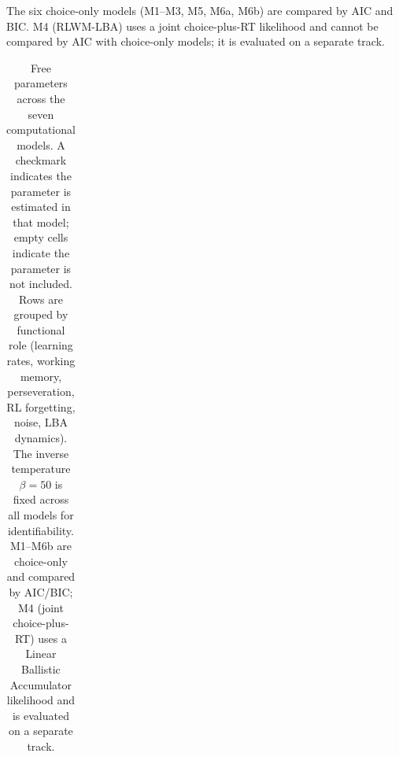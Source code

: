 \documentclass{article}
\begin{document}
The six choice-only models (M1--M3, M5, M6a, M6b) are compared by AIC
and BIC. M4 (RLWM-LBA) uses a joint choice-plus-RT likelihood and cannot
be compared by AIC with choice-only models; it is evaluated on a
separate track.

{

\begin{longtable}[]{@{}
  >{\raggedright\arraybackslash}p{}
  >{\raggedright\arraybackslash}p{}
  >{\raggedright\arraybackslash}p{}
  >{\raggedright\arraybackslash}p{}
  >{\raggedright\arraybackslash}p{}
  >{\raggedright\arraybackslash}p{}
  >{\raggedright\arraybackslash}p{}
  >{\raggedright\arraybackslash}p{}
  >{\raggedright\arraybackslash}p{}@{}}

\caption{\label{tbl-model-architecture}Free parameters across the seven
computational models. A checkmark indicates the parameter is estimated
in that model; empty cells indicate the parameter is not included. Rows
are grouped by functional role (learning rates, working memory,
perseveration, RL forgetting, noise, LBA dynamics). The inverse
temperature \(\beta = 50\) is fixed across all models for
identifiability. M1--M6b are choice-only and compared by AIC/BIC; M4
(joint choice-plus-RT) uses a Linear Ballistic Accumulator likelihood
and is evaluated on a separate track.}

\tabularnewline


\end{longtable}}
\end{document}

